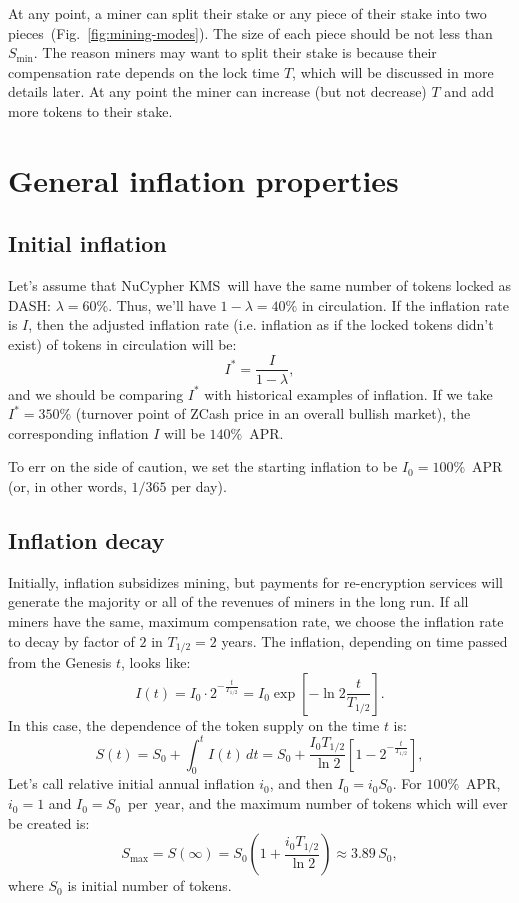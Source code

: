 \documentclass[longbibliography,nofootinbib,twocolumn]{revtex4-1}
\newcommand{\kms}{NuCypher KMS}
\newcommand{\figref}[1]{Fig.~\ref{#1}}
\begin{document}
At any point, a miner can split their stake or any piece of their stake into two pieces~(\figref{fig:mining-modes}).
The size of each piece should be not less than $S_{\min}$.
The reason miners may want to split their stake is because their compensation rate depends on the lock time $T$,
which will be discussed in more details later.
At any point the miner can increase (but not decrease) $T$ and add more tokens to their stake.

\section{General inflation properties}

\subsection{Initial inflation}

Let's assume that \kms~will have the same number of tokens locked as DASH: $\lambda=60\%$.
Thus, we'll have $1-\lambda=40\%$ in circulation.
If the inflation rate is $I$, then the adjusted inflation rate (i.e. inflation as if the locked tokens didn't exist) of tokens in circulation will be:
\begin{equation}
    I^* = \frac{I}{1-\lambda},
\end{equation}
and we should be comparing $I^*$ with historical examples of inflation.
If we take $I^*=350\%$ (turnover point of ZCash price in an overall bullish market), the corresponding inflation $I$ will be $140\%$~APR.

To err on the side of caution, we set the starting inflation to be $I_0=100\%$~APR (or, in other words, $1/365$ per day).

\subsection{Inflation decay}

Initially, inflation subsidizes mining, but payments for re-encryption services will generate the majority or all of the revenues of miners in the long run.
If all miners have the same, maximum compensation rate, we choose the inflation rate to decay by factor of $2$ in $T_{1/2} = 2$ years.
The inflation, depending on time passed from the Genesis $t$, looks like:
\begin{equation}
    I(t) = I_0 \cdot 2^{-\frac{t}{T_{1/2}}} = I_0 \exp\left[ -\ln{2} \frac{t}{T_{1/2}} \right].
\end{equation}
In this case, the dependence of the token supply on the time $t$ is:
\begin{equation}
    \label{eq:supply-time}
    S(t) = S_0 + \int_0^{t} I(t)\, dt = S_0 + \frac{I_0 T_{1/2}}{\ln{2}}\left[1 - 2^{-\frac{t}{T_{1/2}}} \right],
\end{equation}
Let's call relative initial annual inflation $i_0$, and then $I_0 = i_0 S_0$.
For $100\%$~APR, $i_0=1$ and $I_0=S_0$~per~year, and the maximum number of tokens which will ever be created is:
\begin{equation}
    S_{\max} = S(\infty) = S_0\left(1 + \frac{i_0 T_{1/2}}{\ln{2}}\right) \approx 3.89\, S_0,
\end{equation}
where $S_0$ is initial number of tokens.
\end{document}
